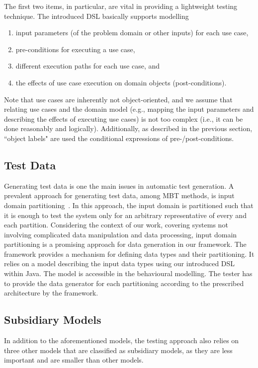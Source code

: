The first two items, in particular, are vital in providing a lightweight testing technique. The introduced DSL basically supports modelling  
\begin{enumerate}
	\item input parameters (of the problem domain or other inputs) for each use case,
	
	\item pre-conditions for executing a use case, 
	
	\item different execution paths for each use case, and
	
	\item the effects of use case execution on domain objects (post-conditions).
\end{enumerate}

Note that use cases are inherently not object-oriented, and we assume that relating use cases and the domain model (e.g., mapping the input parameters and describing the effects of executing use cases) is not too complex (i.e., it can be done reasonably and logically). Additionally, as described in the previous section, ``object labels" are used the conditional expressions of pre-/post-conditions.

\subsection{Test Data}
\label{sec:framework-overview-test-data}
Generating test data is one the main issues in automatic test generation. A prevalent approach for generating test data, among MBT methods, is input domain partitioning~\cite{Ammann2008}. In this approach, the input domain is partitioned such that it is enough to test the system only for an arbitrary representative of every and each partition. Considering the context of our work, covering systems not involving complicated data manipulation and data processing, input domain partitioning is a promising approach for data generation in our framework.
The framework provides a mechanism for defining data types and their partitioning. It relies on a model describing the input data types using our introduced DSL within Java. The model is accessible in the behavioural modelling. The tester has to provide the data generator for each partitioning according to the prescribed architecture by the framework. 

\subsection{Subsidiary Models}
\label{sec:framework-overview-test-data}
In addition to the aforementioned models, the testing approach also relies on three other models that are classified as subsidiary models, as they are less important and are smaller than other models. 

